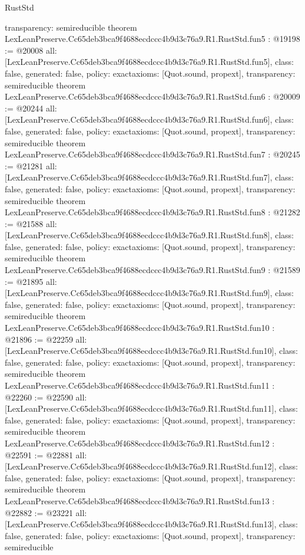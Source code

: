 \begin{lexlean}{RustStd}
\begin{coremodule}
{  transparency: semireducible
}
theorem LexLeanPreserve.Cc65deb3bca9f4688ecdccc4b9d3c76a9.R1.RustStd.fun5 : @19198 := @20008 {
  all: [LexLeanPreserve.Cc65deb3bca9f4688ecdccc4b9d3c76a9.R1.RustStd.fun5],
  class: false,
  generated: false,
  policy: exact{axioms: [Quot.sound, propext]},
  transparency: semireducible
}
theorem LexLeanPreserve.Cc65deb3bca9f4688ecdccc4b9d3c76a9.R1.RustStd.fun6 : @20009 := @20244 {
  all: [LexLeanPreserve.Cc65deb3bca9f4688ecdccc4b9d3c76a9.R1.RustStd.fun6],
  class: false,
  generated: false,
  policy: exact{axioms: [Quot.sound, propext]},
  transparency: semireducible
}
theorem LexLeanPreserve.Cc65deb3bca9f4688ecdccc4b9d3c76a9.R1.RustStd.fun7 : @20245 := @21281 {
  all: [LexLeanPreserve.Cc65deb3bca9f4688ecdccc4b9d3c76a9.R1.RustStd.fun7],
  class: false,
  generated: false,
  policy: exact{axioms: [Quot.sound, propext]},
  transparency: semireducible
}
theorem LexLeanPreserve.Cc65deb3bca9f4688ecdccc4b9d3c76a9.R1.RustStd.fun8 : @21282 := @21588 {
  all: [LexLeanPreserve.Cc65deb3bca9f4688ecdccc4b9d3c76a9.R1.RustStd.fun8],
  class: false,
  generated: false,
  policy: exact{axioms: [Quot.sound, propext]},
  transparency: semireducible
}
theorem LexLeanPreserve.Cc65deb3bca9f4688ecdccc4b9d3c76a9.R1.RustStd.fun9 : @21589 := @21895 {
  all: [LexLeanPreserve.Cc65deb3bca9f4688ecdccc4b9d3c76a9.R1.RustStd.fun9],
  class: false,
  generated: false,
  policy: exact{axioms: [Quot.sound, propext]},
  transparency: semireducible
}
theorem LexLeanPreserve.Cc65deb3bca9f4688ecdccc4b9d3c76a9.R1.RustStd.fun10 : @21896 := @22259 {
  all: [LexLeanPreserve.Cc65deb3bca9f4688ecdccc4b9d3c76a9.R1.RustStd.fun10],
  class: false,
  generated: false,
  policy: exact{axioms: [Quot.sound, propext]},
  transparency: semireducible
}
theorem LexLeanPreserve.Cc65deb3bca9f4688ecdccc4b9d3c76a9.R1.RustStd.fun11 : @22260 := @22590 {
  all: [LexLeanPreserve.Cc65deb3bca9f4688ecdccc4b9d3c76a9.R1.RustStd.fun11],
  class: false,
  generated: false,
  policy: exact{axioms: [Quot.sound, propext]},
  transparency: semireducible
}
theorem LexLeanPreserve.Cc65deb3bca9f4688ecdccc4b9d3c76a9.R1.RustStd.fun12 : @22591 := @22881 {
  all: [LexLeanPreserve.Cc65deb3bca9f4688ecdccc4b9d3c76a9.R1.RustStd.fun12],
  class: false,
  generated: false,
  policy: exact{axioms: [Quot.sound, propext]},
  transparency: semireducible
}
theorem LexLeanPreserve.Cc65deb3bca9f4688ecdccc4b9d3c76a9.R1.RustStd.fun13 : @22882 := @23221 {
  all: [LexLeanPreserve.Cc65deb3bca9f4688ecdccc4b9d3c76a9.R1.RustStd.fun13],
  class: false,
  generated: false,
  policy: exact{axioms: [Quot.sound, propext]},
  transparency: semireducible
}
\end{coremodule}
\end{lexlean}
